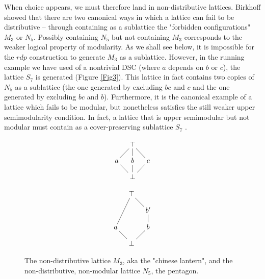\documentclass[hoptionsi,review,format=acmsmall]{acmart}
\theoremstyle{definition}
\begin{document}
When choice appears, we must therefore land in non-distributive lattices. Birkhoff showed that there are two canonical ways in which a lattice can fail to be distributive -- through containing as a sublattice the "forbidden configurations" \(M_3\) or \(N_5\). Possibly containing \(N_5\) but not containing \(M_3\) corresponds to the weaker logical property of modularity. As we shall see below, it is impossible for the \(rdp\) construction to generate \(M_3\) as a sublattice. However, in the running example we have used of a nontrivial DSC (where \(a\) depends on \(b\) or \(c\)), the lattice \(S_7\) is generated (Figure \ref{Fig3}). This lattice in fact contains two copies of \(N_5\) as a sublattice (the one generated by excluding \(bc\) and \(c\) and the one generated by excluding \(bc\) and \(b\)). Furthermore, it is the canonical example of a lattice which fails to be modular, but nonetheless satisfies the still weaker upper semimodularity condition. In fact, a lattice that is upper semimodular but not modular must contain as a cover-preserving sublattice \(S_7\)  \cite{stern1999semimodular}. 

\begin{figure}
\begin{minipage}[c]{0.3\textwidth}
\begin{equation*}
    \xymatrix@=1em{& \top \ar@{-}[dl] \ar@{-}[d] \ar@{-}[dr] & \\
      a \ar@{-}[dr] & b \ar@{-}[d] & c \ar@{-}[dl]  \\
       & \bot &}
\end{equation*}
\end{minipage}
\begin{minipage}[c]{0.3\textwidth}
\begin{equation*}
    \xymatrix@=1em{& \top \ar@{-}[ddl] \ar@{-}[dr] & \\
      & & b'  \ar@{-}[d]  \\
      a \ar@{-}[dr] & & b \ar@{-}[dl] \\
      & \bot &}
\end{equation*}
\end{minipage}

\caption{The non-distributive lattice \(M_3\), aka the "chinese lantern", and the non-distributive, non-modular lattice \(N_5\), the pentagon.}
\label{Fig2}
\end{figure}
\end{document}
